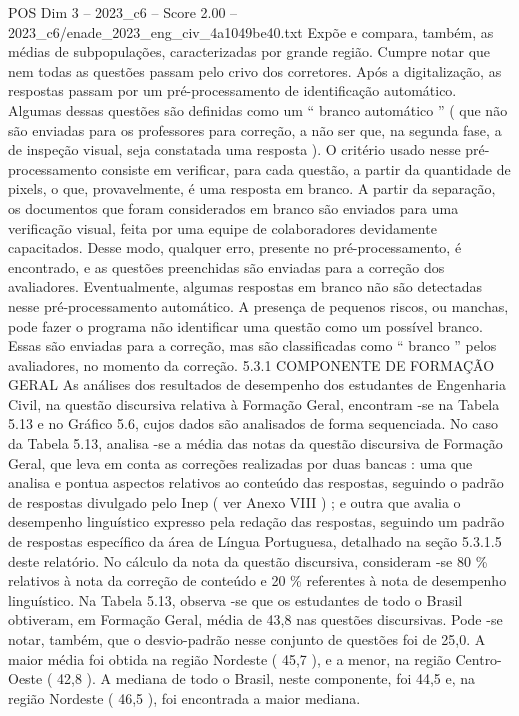 \begin{textsample}{POS Dim 3 – 2023\_c6 – Score 2.00 – 2023\_c6/enade\_2023\_eng\_civ\_4a1049be40.txt}
Expõe e compara, também, as médias de subpopulações, caracterizadas por grande região.
Cumpre notar que nem todas as questões passam pelo crivo dos corretores.
Após a digitalização, as respostas passam por um pré-processamento de identificação automático.
Algumas dessas questões são definidas como um “ branco automático ” ( que não são enviadas para os professores para correção, a não ser que, na segunda fase, a de inspeção visual, seja constatada uma resposta ).
O critério usado nesse pré-processamento consiste em verificar, para cada questão, a partir da quantidade de pixels, o que, provavelmente, é uma resposta em branco.
A partir da separação, os documentos que foram considerados em branco são enviados para uma verificação visual, feita por uma equipe de colaboradores devidamente capacitados.
Desse modo, qualquer erro, presente no pré-processamento, é encontrado, e as questões preenchidas são enviadas para a correção dos avaliadores.
Eventualmente, algumas respostas em branco não são detectadas nesse pré-processamento automático.
A presença de pequenos riscos, ou manchas, pode fazer o programa não identificar uma questão como um possível branco.
Essas são enviadas para a correção, mas são classificadas como “ branco ” pelos avaliadores, no momento da correção. 5.3.1 COMPONENTE DE FORMAÇÃO GERAL As análises dos resultados de desempenho dos estudantes de Engenharia Civil, na questão discursiva relativa à Formação Geral, encontram -se na Tabela 5.13 e no Gráfico 5.6, cujos dados são analisados de forma sequenciada.
No caso da Tabela 5.13, analisa -se a média das notas da questão discursiva de Formação Geral, que leva em conta as correções realizadas por duas bancas : uma que analisa e pontua aspectos relativos ao conteúdo das respostas, seguindo o padrão de respostas divulgado pelo Inep ( ver Anexo VIII ) ; e outra que avalia o desempenho linguístico expresso pela redação das respostas, seguindo um padrão de respostas específico da área de Língua Portuguesa, detalhado na seção 5.3.1.5 deste relatório.
No cálculo da nota da questão discursiva, consideram -se 80 \% relativos à nota da correção de conteúdo e 20 \% referentes à nota de desempenho linguístico.
Na Tabela 5.13, observa -se que os estudantes de todo o Brasil obtiveram, em Formação Geral, média de 43,8 nas questões discursivas.
Pode -se notar, também, que o desvio-padrão nesse conjunto de questões foi de 25,0.
A maior média foi obtida na região Nordeste ( 45,7 ), e a menor, na região Centro-Oeste ( 42,8 ).
A mediana de todo o Brasil, neste componente, foi 44,5 e, na região Nordeste ( 46,5 ), foi encontrada a maior mediana.

\end{textsample}
